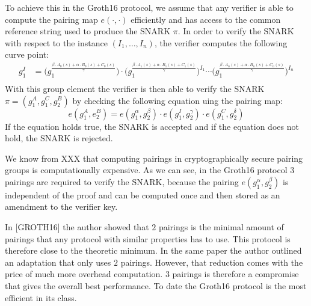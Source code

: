 To achieve this in the Groth16 protocol, we assume that any verifier is able to compute the pairing map $e(\cdot,\cdot)$ efficiently and has access to the common reference string used to produce the SNARK $\pi$. In order to verify the SNARK with respect to the instance $(I_1,\ldots, I_n)$, the verifier computes the following curve point:
\begin{align*}
g_1^I & = \Big(g_1^{\frac{\beta\cdot A_{0}(s)+\alpha\cdot B_{0}(s)+C_{0}(s)}{\gamma}}\Big)\cdot \Big(g_1^{\frac{\beta\cdot A_{1}(s)+\alpha\cdot B_{1}(s)+C_{1}(s)}{\gamma}}\Big)^{I_1} \cdots \Big(g_1^{\frac{\beta\cdot A_{n}(s)+\alpha\cdot B_{n}(s)+C_{n}(s)}{\gamma}}\Big)^{I_n}\\
\end{align*}
With this group element the verifier is then able to verify the SNARK $\pi=(g_1^A,g_1^C,g_2^B)$ by checking the following equation uing the pairing map:
\begin{equation}
e(g_1^A, e_2^B) = e(g_1^\alpha,g_2^\beta)\cdot e(g_1^I,g_2^\gamma)\cdot e(g_1^C,g_2^\delta)
\end{equation}
If the equation holds true, the SNARK is accepted and if the equation does not hold, the SNARK is rejected.
\begin{remark}
We know from XXX that computing pairings in cryptographically secure pairing groups is computationally expensive. As we can see, in the Groth16 protocol $3$ pairings are required to verify the SNARK, because the pairing $e(g_1^\alpha,g_2^\beta)$ is independent of the proof and can be computed once and then stored as an amendment to the verifier key. 

In [GROTH16] the author showed that $2$ pairings is the minimal amount of pairings that any protocol with similar properties has to use. This protocol is therefore close to the theoretic minimum. In the same paper the author outlined an adaptation that only uses $2$ pairings. However, that reduction comes with the price of much more overhead computation. $3$ pairings is therefore a compromise that gives the overall best performance. To date the Groth16 protocol is the most efficient in its class. 
\end{remark}
